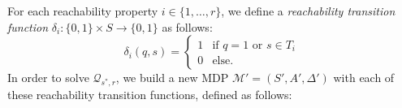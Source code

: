 For each reachability property $i \in \{1, \dots, r\}$, we define a \textit{reachability transition function} $\delta_i: \{0, 1\} \times S \rightarrow \{0,1\}$ as follows:
\[
  \delta_i(q, s) = \begin{cases}
    1 & \text{if } q=1 \text{ or } s \in T_i \\
    0 & \text{else.}
  \end{cases}
\]
In order to solve $\mathcal{Q}_{s^*, r}$, we build a new MDP $\mathcal{M}'=(S', A', \Delta')$ with each of these reachability transition functions, defined as follows:
